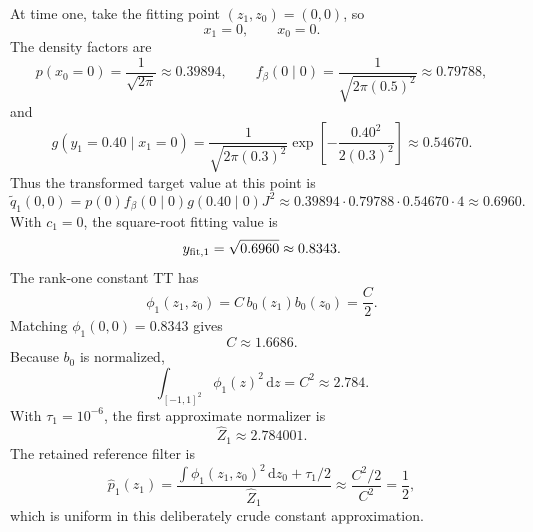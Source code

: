 \documentclass[11pt]{article}
\numberwithin{equation}{section}
\newcommand{\dd}{\,\mathrm d}
\begin{document}
At time one, take the fitting point \((z_1,z_0)=(0,0)\), so
\begin{equation}
    x_1=0,\qquad x_0=0.
    \label{eq:p24-trace-point1}
\end{equation}
The density factors are
\begin{equation}
    p(x_0=0)=\frac{1}{\sqrt{2\pi}}\approx0.39894,
    \qquad
    f_\beta(0\mid0)=\frac{1}{\sqrt{2\pi(0.5)^2}}\approx0.79788,
    \label{eq:p24-trace-density1}
\end{equation}
and
\begin{equation}
    g(y_1=0.40\mid x_1=0)
    =
    \frac{1}{\sqrt{2\pi(0.3)^2}}
    \exp\!\left[-\frac{0.40^2}{2(0.3)^2}\right]
    \approx0.54670.
    \label{eq:p24-trace-density2}
\end{equation}
Thus the transformed target value at this point is
\begin{equation}
    \widetilde q_1(0,0)
    =
    p(0)f_\beta(0\mid0)g(0.40\mid0)J^2
    \approx
    0.39894\cdot0.79788\cdot0.54670\cdot4
    \approx0.6960.
    \label{eq:p24-trace-q1}
\end{equation}
With \(c_1=0\), the square-root fitting value is
\begin{equation}
    y_{\rm fit,1}=\sqrt{0.6960}\approx0.8343.
    \label{eq:p24-trace-root1}
\end{equation}
The rank-one constant TT has
\begin{equation}
    \phi_1(z_1,z_0)=C\,b_0(z_1)b_0(z_0)=\frac{C}{2}.
    \label{eq:p24-trace-phi1}
\end{equation}
Matching \(\phi_1(0,0)=0.8343\) gives
\begin{equation}
    C\approx1.6686.
    \label{eq:p24-trace-c1}
\end{equation}
Because \(b_0\) is normalized,
\begin{equation}
    \int_{[-1,1]^2}\phi_1(z)^2\dd z=C^2\approx2.784.
    \label{eq:p24-trace-mass1}
\end{equation}
With \(\tau_1=10^{-6}\), the first approximate normalizer is
\begin{equation}
    \widehat Z_1\approx2.784001.
    \label{eq:p24-trace-z1}
\end{equation}
The retained reference filter is
\begin{equation}
    \widehat p_1(z_1)
    =
    \frac{\int\phi_1(z_1,z_0)^2\dd z_0+\tau_1/2}
         {\widehat Z_1}
    \approx
    \frac{C^2/2}{C^2}
    =
    \frac12,
    \label{eq:p24-trace-p1}
\end{equation}
which is uniform in this deliberately crude constant approximation.
\end{document}
